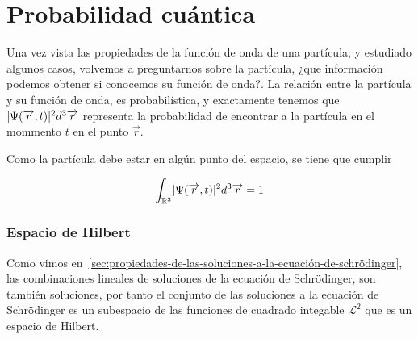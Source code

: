 \chapter{Probabilidad cuántica}\label{ch:probabilidad-cuántica}

Una vez vista las propiedades de la función de onda de una partícula, y estudiado algunos casos, volvemos a preguntarnos sobre la partícula, ¿que información podemos obtener si conocemos su función de onda?.
La relación entre la partícula y su función de onda, es probabilística, y exactamente tenemos que $\lvert\Psi(\overrightarrow{r}, t)\rvert^2 d^3\overrightarrow{r}$ representa la probabilidad de encontrar a la partícula en el mommento $t$ en el punto $\vec{r}$.

Como la partícula debe estar en algún punto del espacio, se tiene que cumplir
\begin{postulate}
    \begin{equation}
        \label{eq:condicion_probabilistica_fuconda}
        \int_{\mathbb{R}^3}\lvert\Psi(\overrightarrow{r}, t)\rvert^2 d^3\overrightarrow{r}=1
    \end{equation}
\end{postulate}

\subsection{Espacio de Hilbert}\label{subsec:espacio-de-hilbert}

Como vimos en~\ref{sec:propiedades-de-las-soluciones-a-la-ecuación-de-schrödinger}, las combinaciones lineales de soluciones de la ecuación de Schrödinger, son también soluciones, por tanto el conjunto de las soluciones a la ecuación de Schrödinger es un subespacio de las funciones de cuadrado integable $\mathscr{L}^2$ que es un espacio de Hilbert.